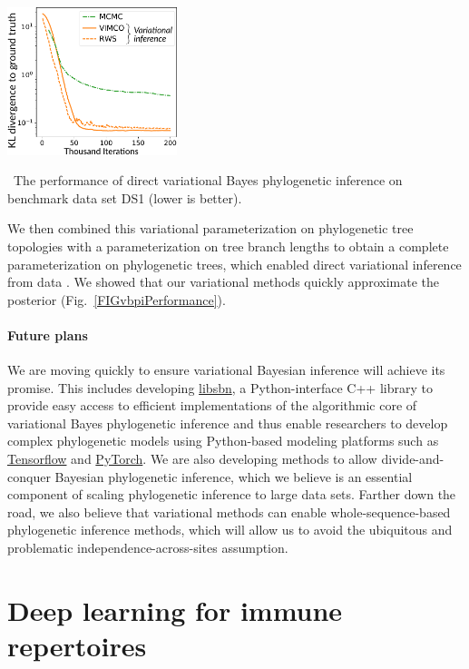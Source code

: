 \documentclass[nobib]{tufte-handout}
\begin{document}
\begin{marginfigure}[0.7in]%
  \includegraphics[width=1.95in]{vbpi-performance}
  \caption{\
    The performance of direct variational Bayes phylogenetic inference on benchmark data set DS1 (lower is better).
    }
  \label{FIGvbpiPerformance}
\end{marginfigure}%

We then combined this variational parameterization on phylogenetic tree topologies with a parameterization on tree branch lengths to obtain a complete parameterization on phylogenetic trees, which enabled direct variational inference from data \cite{Zhang2018-lw}.
We showed that our variational methods quickly approximate the posterior (Fig.~\ref{FIGvbpiPerformance}).

\paragraph{Future plans}
We are moving quickly to ensure variational Bayesian inference will achieve its promise.
This includes developing \href{https://github.com/matsengrp/libsbn/}{libsbn}, a Python-interface C++ library to provide easy access to efficient implementations of the algorithmic core of variational Bayes phylogenetic inference and thus enable researchers to develop complex phylogenetic models using Python-based modeling platforms such as \href{https://www.tensorflow.org/}{Tensorflow} and \href{https://pytorch.org/}{PyTorch}.
We are also developing methods to allow divide-and-conquer Bayesian phylogenetic inference, which we believe is an essential component of scaling phylogenetic inference to large data sets.
Farther down the road, we also believe that variational methods can enable whole-sequence-based phylogenetic inference methods, which will allow us to avoid the ubiquitous and problematic independence-across-sites assumption.


\vspace{0.3cm}
\section{Deep learning for immune repertoires}
\vspace{-0.3cm}
\end{document}

